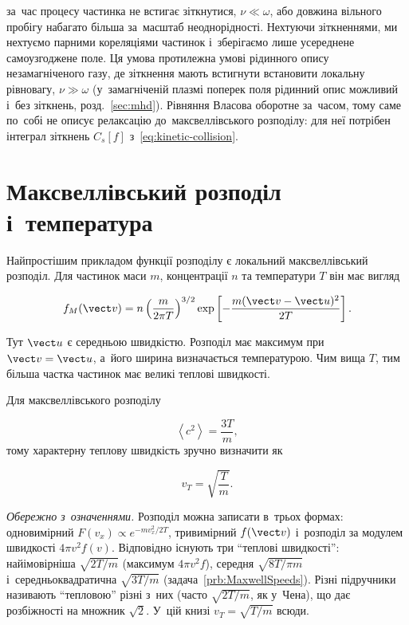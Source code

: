  за~час процесу частинка не встигає зіткнутися, $\nu\ll\omega$, або довжина вільного пробігу набагато більша за~масштаб неоднорідності. Нехтуючи зіткненнями, ми нехтуємо парними кореляціями частинок і~зберігаємо лише усереднене самоузгоджене поле. Ця умова протилежна умові рідинного опису незамагніченого газу, де зіткнення мають встигнути встановити локальну рівновагу, $\nu\gg\omega$ (у~замагніченій плазмі поперек поля рідинний опис можливий і~без зіткнень, розд.~\ref{sec:mhd}). Рівняння Власова оборотне за~часом, тому саме по~собі не описує релаксацію до~максвеллівського розподілу: для неї потрібен інтеграл зіткнень $C_s[f]$ з~\eqref{eq:kinetic-collision}.

\section{Максвеллівський розподіл і~температура}

Найпростішим прикладом функції розподілу є локальний максвеллівський розподіл. Для
частинок маси $m$, концентрації $n$ та температури $T$ він має вигляд

\begin{equation}\label{eq:maxwell-distribution}
 f_M(\vect v)=
 n\left(\frac{m}{2\pi T}\right)^{3/2}
 \exp\left[
 -\frac{m(\vect v-\vect u)^2}{2T}
 \right].
\end{equation}

Тут $\vect u$ є середньою швидкістю. Розподіл має максимум при $\vect v=\vect u$,
а~його ширина визначається температурою. Чим вища $T$, тим більша частка частинок має
великі теплові швидкості.

Для максвеллівського розподілу

\begin{equation}\label{eq:thermal-speed}
 \left\langle c^2\right\rangle
 =\frac{3T}{m},
\end{equation}
%
тому характерну теплову швидкість зручно визначити як

\begin{equation}\label{eq:thermal-speed-definition}
 v_T=\sqrt{\frac{T}{m}}.
\end{equation}

\emph{Обережно з~означеннями.} Розподіл можна записати в~трьох формах: одновимірний
$F(v_x)\propto e^{-mv_x^2/2T}$, тривимірний $f(\vect v)$ і~розподіл за модулем швидкості
$4\pi v^2f(v)$. Відповідно існують три \enquote{теплові швидкості}: найімовірніша $\sqrt{2T/m}$
(максимум $4\pi v^2f$), середня $\sqrt{8T/\pi m}$ і~середньоквадратична $\sqrt{3T/m}$
(задача~\ref{prb:MaxwellSpeeds}). Різні підручники називають \enquote{тепловою} різні з~них (часто
$\sqrt{2T/m}$, як у~Чена), що дає розбіжності на множник $\sqrt2$. У~цій книзі
$v_T=\sqrt{T/m}$ всюди.

